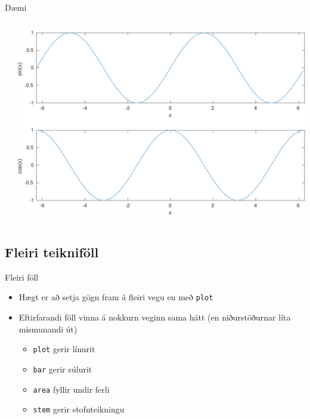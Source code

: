 \documentclass[handout]{beamer}
\begin{document}
\begin{frame}[fragile]{Dæmi}
\begin{columns}
\inputminted[frame=lines, label=subplotexample.m, fontsize=\scriptsize]{matlab}{Code/subplotexample.m}
\includegraphics[width=\textwidth]{Pics/subplot-example.pdf}
\end{columns}
\end{frame}

\subsection{Fleiri teikniföll}

\begin{frame}{Fleiri föll}
\begin{itemize}
 \item Hægt er að setja gögn fram á fleiri vegu en með \texttt{plot}
 \item Eftirfarandi föll vinna á nokkurn veginn sama hátt (en niðurstöðurnar líta mismunandi út)
 \begin{itemize}
  \item \texttt{plot} gerir línurit
  \item \texttt{bar} gerir súlurit
  \item \texttt{area} fyllir undir ferli
  \item \texttt{stem} gerir stofnteikningu
 \end{itemize}
\end{itemize}
\end{frame}
\end{document}

